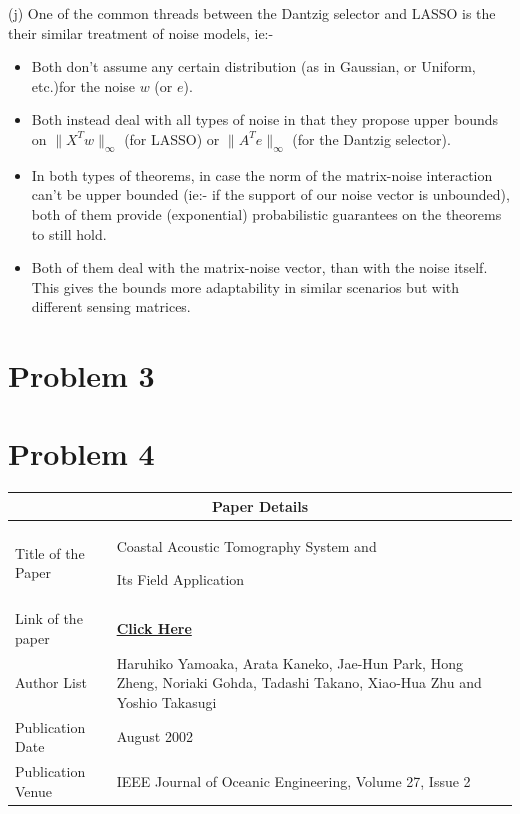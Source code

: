 \documentclass[a4paper,11pt]{article}
\numberwithin{definition}{section}
\numberwithin{mytheorem}{subsection}
\begin{document}
(j) One of the common threads between the Dantzig selector and LASSO is the their similar treatment of noise models, ie:-
\begin{itemize}
    \item Both don't assume any certain distribution (as in Gaussian, or Uniform, etc.)for the noise $w$ (or $e$).
    \item Both instead deal with all types of noise in that they propose upper bounds on $\lVert X^Tw\rVert_{\infty}$ (for LASSO) or $\lVert A^Te\rVert_{\infty}$ (for the Dantzig selector).
    \item In both types of theorems, in case the norm of the matrix-noise interaction can't be upper bounded (ie:- if the support of our noise vector is unbounded), both of them provide (exponential) probabilistic guarantees on the theorems to still hold.
    \item Both of them deal with the matrix-noise vector, than with the noise itself. This gives the bounds more adaptability in similar scenarios but with different sensing matrices.
\end{itemize}
\section{Problem 3}


\section{Problem 4}

\begin{center}
    \begin{tabular}{ |p{3.5cm}||p{10cm}|}
   
    \hline
    \multicolumn{2}{|c|}{Paper Details} \\
    \hline
    Title of the Paper& Coastal Acoustic Tomography System and 
    
    Its Field Application\\
    \hline
    Link of the paper  &  \href{https://ieeexplore.ieee.org/document/1002483}{\textbf{Click Here}}  \\
    \hline
    Author List & Haruhiko Yamoaka, Arata Kaneko, Jae-Hun Park, Hong Zheng, Noriaki Gohda, Tadashi Takano, Xiao-Hua Zhu and Yoshio Takasugi \\
    \hline
    Publication Date  & August 2002 \\
    \hline
    Publication Venue  &  IEEE Journal of Oceanic Engineering, Volume 27, Issue 2 \\
    \hline
   \end{tabular}
\end{center}
\end{document}
